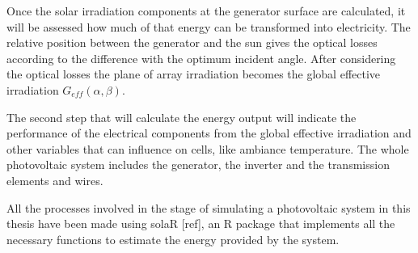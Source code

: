 Once the solar irradiation components at the generator surface are calculated, it will be assessed how much of that energy can be transformed into electricity. The relative position between the generator and the sun gives the optical losses according to the difference with the optimum incident angle. After considering the optical losses the plane of array irradiation becomes the global effective irradiation $G_{eff}(\alpha, \beta)$.

The second step that will calculate the energy output will indicate the performance of the electrical components from the global effective irradiation and other variables that can influence on cells, like ambiance temperature. The whole photovoltaic system includes the generator, the inverter and the transmission elements and wires.



All the processes involved in the stage of simulating a photovoltaic system in this thesis have been made using solaR [ref], an R package that implements all the necessary functions to estimate the energy provided by the system.

